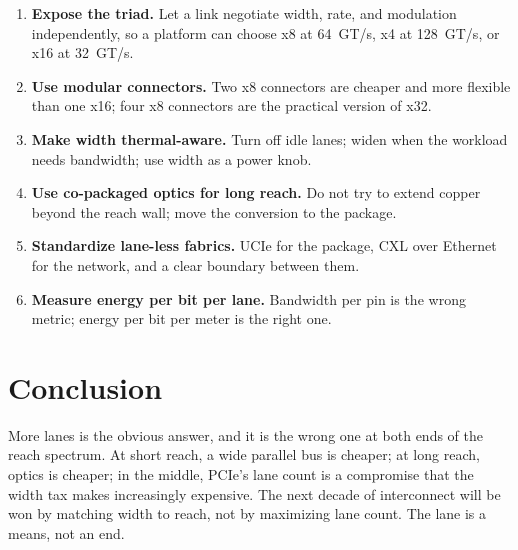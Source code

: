 \documentclass[10pt,letterpaper]{article}
\begin{document}
\begin{enumerate}
\item \textbf{Expose the triad.} Let a link negotiate width, rate, and modulation independently, so a platform can choose x8 at 64~GT/s, x4 at 128~GT/s, or x16 at 32~GT/s.
\item \textbf{Use modular connectors.} Two x8 connectors are cheaper and more flexible than one x16; four x8 connectors are the practical version of x32.
\item \textbf{Make width thermal-aware.} Turn off idle lanes; widen when the workload needs bandwidth; use width as a power knob.
\item \textbf{Use co-packaged optics for long reach.} Do not try to extend copper beyond the reach wall; move the conversion to the package.
\item \textbf{Standardize lane-less fabrics.} UCIe for the package, CXL over Ethernet for the network, and a clear boundary between them.
\item \textbf{Measure energy per bit per lane.} Bandwidth per pin is the wrong metric; energy per bit per meter is the right one.
\end{enumerate}

\section{Conclusion}
\label{sec:conclusion}

More lanes is the obvious answer, and it is the wrong one at both ends of the reach spectrum. At short reach, a wide parallel bus is cheaper; at long reach, optics is cheaper; in the middle, PCIe's lane count is a compromise that the width tax makes increasingly expensive. The next decade of interconnect will be won by matching width to reach, not by maximizing lane count. The lane is a means, not an end.
\end{document}

